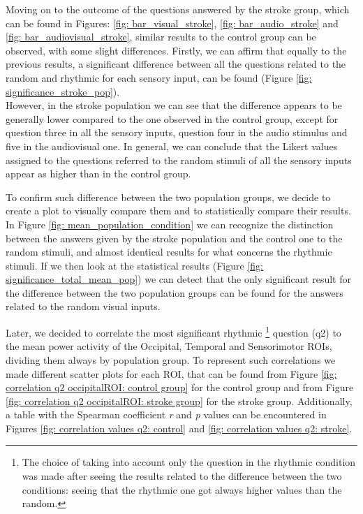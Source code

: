 Moving on to the outcome of the questions answered by the stroke group, which can be found in Figures: \ref{fig: bar_visual_stroke}, \ref{fig: bar_audio_stroke} and \ref{fig: bar_audiovisual_stroke}, similar results to the control group can be observed, with some slight differences. Firstly, we can affirm that equally to the previous results, a significant difference between all the questions related to the random and rhythmic for each sensory input, can be found (Figure \ref{fig: significance_stroke_pop}). \\ However, in the stroke population we can see that the difference appears to be generally lower compared to the one observed in the control group, except for question three in all the sensory inputs, question four in the audio stimulus and five in the audiovisual one. In general, we can conclude that the Likert values assigned to the questions referred to the random stimuli of all the sensory inputs appear as higher than in the control group.

To confirm such difference between the two population groups, we decide to create a plot to visually compare them and to statistically compare their results. In Figure \ref{fig: mean_population_condition} we can recognize the distinction between the answers given by the stroke population and the control one to the random stimuli, and almost identical results for what concerns the rhythmic stimuli. If we then look at the statistical results (Figure \ref{fig: significance_total_mean_pop}) we can detect that the only significant result for the difference between the two population groups can be found for the answers related to the random visual inputs. 

Later, we decided to correlate the most significant rhythmic \footnote{The choice of taking into account only the question in the rhythmic condition was made after seeing the results related to the difference between the two conditions: seeing that the rhythmic one got always higher values than the random.} question (q2) to the mean power activity of the Occipital, Temporal and Sensorimotor ROIs, dividing them always by population group. To represent such correlations we made different scatter plots for each ROI, that can be found from Figure \ref{fig: correlation q2 occipitalROI: control group} for the control group and from Figure \ref{fig: correlation q2 occipitalROI: stroke group} for the stroke group. Additionally, a table with the Spearman coefficient \textit{r} and \textit{p} values can be encountered in Figures \ref{fig: correlation values q2: control} and \ref{fig: correlation values q2: stroke}. 

